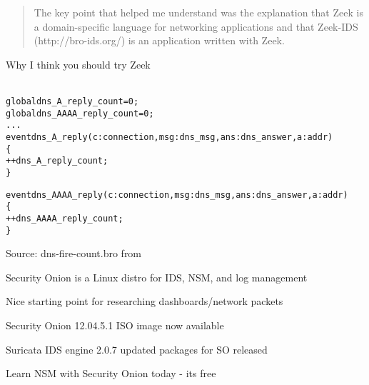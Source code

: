\documentclass[20pt,landscape,a4paper,footrule]{foils}
\begin{document}
\begin{quote}
	The key point that helped me understand was the explanation that Zeek is a
               domain-specific language for networking applications and that Zeek-IDS
               (http://bro-ids.org/) is an application written with Zeek.
\end{quote}

Why I think you should try Zeek\\
\\


\begin{alltt}\small
global dns_A_reply_count=0;
global dns_AAAA_reply_count=0;
...
event dns_A_reply(c: connection, msg: dns_msg, ans: dns_answer, a: addr)
	\{
	++dns_A_reply_count;
	\}

event dns_AAAA_reply(c: connection, msg: dns_msg, ans: dns_answer, a: addr)
	\{
	++dns_AAAA_reply_count;
	\}
\end{alltt}

Source: dns-fire-count.bro from\\
{\small {}}




\begin{list2}
\item Security Onion is a Linux distro for IDS, NSM, and log management
\item {}
\item {}
\end{list2}

\centerline{Nice starting point for researching dashboards/network packets}


\begin{list2}
\item Security Onion 12.04.5.1 ISO image now available
\item Suricata IDS engine 2.0.7 updated packages for SO released
\item Learn NSM with Security Onion today - its free
\end{list2}
{\small{}\\
}
\end{document}

